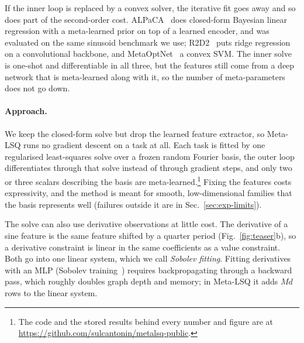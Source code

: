 \documentclass[fullpaper,final]{nldl}
\theoremstyle{plain}
\theoremstyle{definition}
\begin{document}
If the inner loop is replaced by a convex solver, the iterative fit goes away and
so does part of the second-order cost. ALPaCA~\citep{harrison2018alpaca} does
closed-form Bayesian linear regression with a meta-learned prior on top of a
learned encoder, and was evaluated on the same sinusoid benchmark we use;
R2D2~\citep{bertinetto2019r2d2} puts ridge regression on a convolutional
backbone, and MetaOptNet~\citep{lee2019metaoptnet} a convex SVM. The inner solve
is one-shot and differentiable in all three, but the features still come from a
deep network that is meta-learned along with it, so the number of meta-parameters
does not go down.

\paragraph{Approach.}
We keep the closed-form solve but drop the learned feature extractor, so Meta-LSQ
runs no gradient descent on a task at all. Each task is fitted by one regularised
least-squares solve over a frozen random Fourier basis, the outer loop
differentiates through that solve instead of through gradient steps, and only two or
three scalars describing the basis are meta-learned.\footnote{The code and the stored results behind every number and
figure are at \url{https://github.com/sulcantonin/metalsq-public}.} Fixing the
features costs expressivity, and the method is
meant for smooth, low-dimensional families that the basis represents well
(failures outside it are in Sec.~\ref{sec:exp-limits}).

The solve can also use derivative observations at little cost. The derivative
of a sine feature is the same feature shifted by a quarter period
(Fig.~\ref{fig:teaser}b), so a derivative constraint is linear in the same
coefficients as a value constraint. Both go into one linear system, which we call
\emph{Sobolev fitting}. Fitting derivatives with an MLP (Sobolev
training~\citep{czarnecki2017sobolev}) requires backpropagating through a backward
pass, which roughly doubles graph depth and memory; in Meta-LSQ it adds $Md$ rows to
the linear system.
\end{document}

